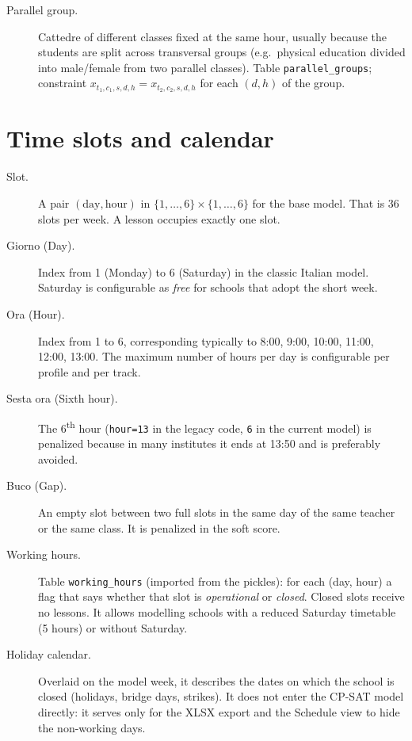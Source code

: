 \begin{description}
\item[Parallel group.]
  Cattedre of different classes fixed at the same hour, usually
  because the students are split across transversal groups (e.g.\
  physical education divided into male/female from two parallel
  classes). Table \texttt{parallel\_groups}; constraint
  $x_{t_1, c_1, s, d, h} = x_{t_2, c_2, s, d, h}$ for each
  $(d, h)$ of the group.
\end{description}

\section{Time slots and calendar}

\begin{description}
\item[Slot.]
  A pair $(\text{day}, \text{hour})$ in
  $\{1,\ldots,6\} \times \{1,\ldots,6\}$ for the base model. That
  is 36 slots per week. A lesson occupies exactly one slot.

\item[Giorno (Day).]
  Index from 1 (Monday) to 6 (Saturday) in the classic Italian
  model. Saturday is configurable as \emph{free} for schools that
  adopt the short week.

\item[Ora (Hour).]
  Index from 1 to 6, corresponding typically to 8:00, 9:00,
  10:00, 11:00, 12:00, 13:00. The maximum number of hours per day
  is configurable per profile and per track.

\item[Sesta ora (Sixth hour).]
  The 6\textsuperscript{th} hour (\texttt{hour=13} in the legacy
  code, \texttt{6} in the current model) is penalized because in
  many institutes it ends at 13:50 and is preferably avoided.

\item[Buco (Gap).]
  An empty slot between two full slots in the same day of the same
  teacher or the same class. It is penalized in the soft score.

\item[Working hours.]
  Table \texttt{working\_hours} (imported from the pickles): for
  each (day, hour) a flag that says whether that slot is
  \emph{operational} or \emph{closed}. Closed slots receive no
  lessons. It allows modelling schools with a reduced Saturday
  timetable (5 hours) or without Saturday.

\item[Holiday calendar.]
  Overlaid on the model week, it describes the dates on which the
  school is closed (holidays, bridge days, strikes). It does not
  enter the CP-SAT model directly: it serves only for the XLSX
  export and the Schedule view to hide the non-working days.
\end{description}

